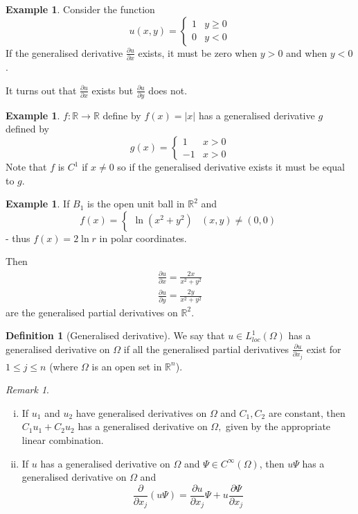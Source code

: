 \documentclass[10pt, oneside, reqno]{amsart}
\theoremstyle{plain}%
\numberwithin{equation}{section}
\theoremstyle{definition}
\newtheorem{defn}[thm]{Definition}
\newtheorem{exmp}[thm]{Example}
\theoremstyle{remark}
\newtheorem*{rem}{Remark}
\newcommand{\R}{\mathbb{R}}
\begin{document}
\begin{exmp}
    Consider the function \[
        u(x, y) = \begin{cases}
            1 & y \geq 0    \\
            0 & y < 0       
        \end{cases}
    \]  If the generalised derivative $\frac{\partial u}{\partial x}$ exists, it must be zero when $y > 0$ and when $y < 0$.  
    
    It turns out that $\frac{\partial u}{\partial x}$ exists but $\frac{\partial u}{\partial y}$ does not.
\end{exmp}

\begin{exmp}
    $f: \R \rightarrow \R$ define by $f(x) = |x|$ has a generalised derivative $g$ defined by \[
        g(x) = \begin{cases}
            1 & x > 0 \\
            -1 & x > 0
        \end{cases}
    \]  Note that $f$ is $C^1$ if $x \neq 0$ so if the generalised derivative exists it must be equal to $g$. 
    \end{exmp}

\begin{exmp}
    If $B_1$ is the open unit ball in $\R^2$ and \[
        f(x) = \begin{cases}
            \ln(x^2 + y^2) & (x, y) \neq (0, 0) 
        \end{cases}
    \] - thus $f(x) = 2 \ln r$ in polar coordinates.
    
    Then \begin{align*}
        \frac{\partial u}{\partial x} = \frac{2x}{x^2 + y^2}  \\
        \frac{\partial u}{\partial y} = \frac{2y}{x^2 + y^2} 
    \end{align*} are the generalised partial derivatives on $\R^2$.
\end{exmp}

\begin{defn}[Generalised derivative]
    We say that $u \in L^1_{loc}(\Omega)$ has a generalised derivative on $\Omega$ if all the generalised partial derivatives $\frac{\partial u}{\partial x_j}$ exist for $1 \leq j \leq n$ (where $\Omega$ is an open set in $\R^n$).
\end{defn}

\begin{rem}{\ }
    \begin{enumerate}[(i)]
        \item If $u_1$ and $u_2$ have generalised derivatives on $\Omega$ and $C_1, C_2$ are constant, then $C_1u_1 + C_2 u_2$ has a generalised derivative on $\Omega,$ given by the appropriate linear combination.  
        \item If $u$ has a generalised derivative on $\Omega$ and $\Psi \in C^\infty(\Omega)$, then  $u\Psi$ has a generalised derivative on $\Omega$ and \[
            \frac{\partial}{\partial x_j} (u \Psi) = \frac{\partial u}{\partial x_j} \Psi + u \frac{\partial \Psi}{\partial x_j}
        \]
    \end{enumerate}
\end{rem}
    
\end{document}
